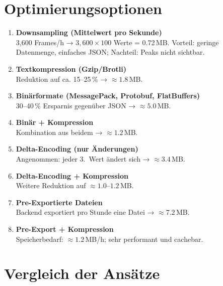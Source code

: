 \section{Optimierungsoptionen}
\begin{enumerate}
    \item \textbf{Downsampling (Mittelwert pro Sekunde)} \\
    3{,}600 Frames/h → $3{,}600 \times 100$ Werte = 0.72\,MB.  
    Vorteil: geringe Datenmenge, einfaches JSON; Nachteil: Peaks nicht sichtbar.
    \item \textbf{Textkompression (Gzip/Brotli)} \\
    Reduktion auf ca. 15–25\,\% → $\approx 1.8$\,MB.
    \item \textbf{Binärformate (MessagePack, Protobuf, FlatBuffers)} \\
    30–40\,\% Ersparnis gegenüber JSON → $\approx 5.0$\,MB.
    \item \textbf{Binär + Kompression} \\
    Kombination aus beidem → $\approx 1.2$\,MB.
    \item \textbf{Delta-Encoding (nur Änderungen)} \\
    Angenommen: jeder 3.~Wert ändert sich → $\approx 3.4$\,MB.
    \item \textbf{Delta-Encoding + Kompression} \\
    Weitere Reduktion auf $\approx 1.0$–$1.2$\,MB.
    \item \textbf{Pre-Exportierte Dateien} \\
    Backend exportiert pro Stunde eine Datei → $\approx 7.2$\,MB.
    \item \textbf{Pre-Export + Kompression} \\
    Speicherbedarf: $\approx 1.2$\,MB/h; sehr performant und cachebar.
\end{enumerate}

\section{Vergleich der Ansätze}

